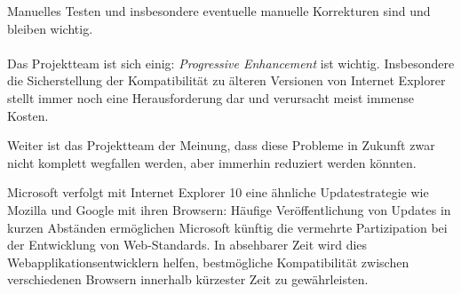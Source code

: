 Manuelles Testen und insbesondere eventuelle manuelle Korrekturen sind und bleiben wichtig.
\\ \\
Das Projektteam ist sich einig: \emph{Progressive Enhancement} ist wichtig. Insbesondere die Sicherstellung der Kompatibilität zu älteren Versionen von Internet Explorer stellt immer noch eine Herausforderung dar und verursacht meist immense Kosten.

Weiter ist das Projektteam der Meinung, dass diese Probleme in Zukunft zwar nicht komplett wegfallen werden, aber immerhin reduziert werden könnten.

Microsoft verfolgt mit Internet Explorer 10 eine ähnliche Updatestrategie wie Mozilla und Google mit ihren Browsern: Häufige Veröffentlichung von Updates in kurzen Abständen \cite{MicrosoftQuickensIEReleaseCycle} ermöglichen Microsoft künftig die vermehrte Partizipation bei der Entwicklung von Web-Standards. In absehbarer Zeit wird dies Webapplikationsentwicklern helfen, bestmögliche Kompatibilität zwischen verschiedenen Browsern innerhalb kürzester Zeit zu gewährleisten.